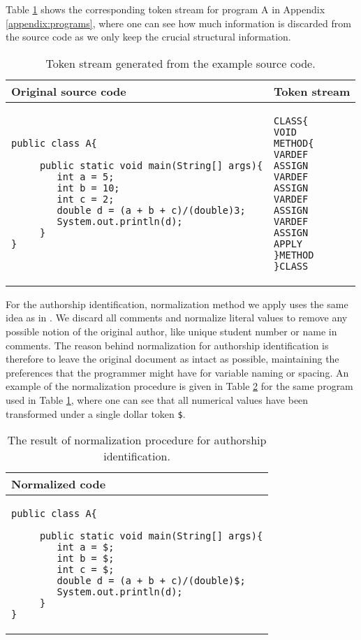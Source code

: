 Table \ref{tbl-token-stream} shows the corresponding token stream for program A in Appendix \ref{appendix:programs}, where one can see how much information is discarded from the source code as we only keep the crucial structural information.

\begin{table}[ht]
\centering
\caption{Token stream generated from the example source code.}
\label{tbl-token-stream}
\begin{tabular}{|l|l|} \hline
\bf Original source code & \bf Token stream \\ \hline
\begin{lstlisting}
public class A{

     public static void main(String[] args){
        int a = 5;
        int b = 10;
        int c = 2;
        double d = (a + b + c)/(double)3;
        System.out.println(d);
     }
}
\end{lstlisting}                     &

\begin{lstlisting}
CLASS{  
VOID    
METHOD{ 
VARDEF 
ASSIGN  
VARDEF 
ASSIGN  
VARDEF 
ASSIGN  
VARDEF 
ASSIGN  
APPLY   
}METHOD 
}CLASS
\end{lstlisting}
\\ \hline      
\end{tabular}
\end{table}

For the authorship identification, normalization method we apply uses the same idea as in \cite{AIRTSCAA2009, SCANG2007}. We discard all comments and normalize literal values to remove any possible notion of the original author, like unique student number or name in comments. The reason behind normalization for authorship identification is therefore to leave the original document as intact as possible, maintaining the preferences that the programmer might have for \eg variable naming or spacing. An example of the normalization procedure is given in Table \ref{tbl-ai-normalization} for the same program used in Table \ref{tbl-token-stream}, where one can see that all numerical values have been transformed under a single dollar token \texttt{\$}.

\begin{table}[ht]
\centering
\caption{The result of normalization procedure for authorship identification.}
\label{tbl-ai-normalization}
\begin{tabular}{|l|} \hline
\bf Normalized code \\ \hline
\begin{lstlisting}
public class A{

     public static void main(String[] args){
        int a = $;
        int b = $;
        int c = $;
        double d = (a + b + c)/(double)$; 
        System.out.println(d);
     }
}
\end{lstlisting} 

\\ \hline      
\end{tabular}
\end{table}

